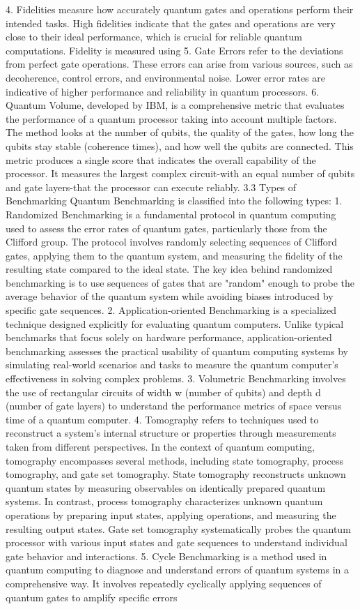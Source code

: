 4. Fidelities measure how accurately quantum gates and operations perform their intended tasks. High fidelities indicate that the gates and operations are very close to their ideal performance, which is crucial for reliable quantum computations. Fidelity is measured using 5. Gate Errors refer to the deviations from perfect gate operations. These errors can arise from various sources, such as decoherence, control errors, and environmental noise. Lower error rates are indicative of higher performance and reliability in quantum processors. 6. Quantum Volume, developed by IBM, is a comprehensive metric that evaluates the performance of a quantum processor taking into account multiple factors. The method looks at the number of qubits, the quality of the gates, how long the qubits stay stable (coherence times), and how well the qubits are connected. This metric produces a single score that indicates the overall capability of the processor. It measures the largest complex circuit-with an equal number of qubits and gate layers-that the processor can execute reliably. 3.3 Types of Benchmarking Quantum Benchmarking is classified into the following types: 1. Randomized Benchmarking is a fundamental protocol in quantum computing used to assess the error rates of quantum gates, particularly those from the Clifford group. The protocol involves randomly selecting sequences of Clifford gates, applying them to the quantum system, and measuring the fidelity of the resulting state compared to the ideal state. The key idea behind randomized benchmarking is to use sequences of gates that are "random" enough to probe the average behavior of the quantum system while avoiding biases introduced by specific gate sequences. 2. Application-oriented Benchmarking is a specialized technique designed explicitly for evaluating quantum computers. Unlike typical benchmarks that focus solely on hardware performance, application-oriented benchmarking assesses the practical usability of quantum computing systems by simulating real-world scenarios and tasks to measure the quantum computer’s effectiveness in solving complex problems. 3. Volumetric Benchmarking involves the use of rectangular circuits of width w (number of qubits) and depth d (number of gate layers) to understand the performance metrics of space versus time of a quantum computer. 4. Tomography refers to techniques used to reconstruct a system’s internal structure or properties through measurements taken from different perspectives. In the context of quantum computing, tomography encompasses several methods, including state tomography, process tomography, and gate set tomography. State tomography reconstructs unknown quantum states by measuring observables on identically prepared quantum systems. In contrast, process tomography characterizes unknown quantum operations by preparing input states, applying operations, and measuring the resulting output states. Gate set tomography systematically probes the quantum processor with various input states and gate sequences to understand individual gate behavior and interactions. 5. Cycle Benchmarking is a method used in quantum computing to diagnose and understand errors of quantum systems in a comprehensive way. It involves repeatedly cyclically applying sequences of quantum gates to amplify specific errors 
